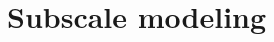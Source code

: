 \documentclass[12pt,a4paper,fleqn]{article}
\renewcommand{\ta}[1]{\mathbfit{#1}}
\renewcommand{\ts}[1]{\mathbfit{#1}}
\newcommand{\figref}[1]{Figure~\ref{#1}}
\newcommand{\pore}{\mathrm{pore}}
\newcommand{\particle}{\mathrm{part}}
\newcommand{\contact}{\mathrm{cont}}
\begin{document}
\section{Subscale modeling}\label{sec:subscale}
% 
% 
% 
% 
\end{document}
